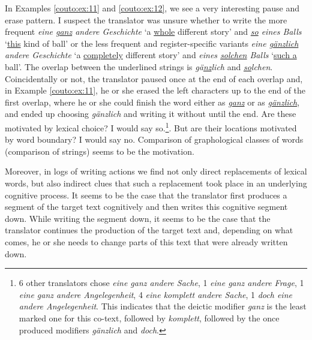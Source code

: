 \documentclass[output=paper]{LSP/langsci}
\begin{document}
In Examples \ref{couto:ex:11} and \ref{couto:ex:12}, we see a very interesting pause and erase pattern. I suspect the translator was unsure whether to write the more frequent \emph{eine \uline{ganz} andere Geschichte} `a \uline{whole} different story' and \emph{\uline{so} eines Balls} `\uline{this} kind of ball' or the less frequent and register-specific variants \emph{eine \uline{gänzlich} andere Geschichte} `a \uline{completely} different story' and  \emph{eines \uline{solchen} Balls} `\uline{such a} ball'. The overlap between the underlined strings is \emph{\uline{g}ä\uline{nz}lich} and \emph{\uline{so}lchen}. Coincidentally or not, the translator paused once at the end of each overlap and, in Example \ref{couto:ex:11}, he or she erased the left characters up to the end of the first overlap, where he or she could finish the word either as \emph{g\uline{anz}} or as \emph{g\uline{änzlich}}, and ended up choosing \emph{gänzlich} and writing it without  until the end. Are these  motivated by lexical choice? I would say so.\footnote{6 other translators chose \emph{eine ganz andere Sache}, 1 \emph{eine ganz andere Frage}, 1 \emph{eine ganz andere Angelegenheit}, 4 \emph{eine komplett andere Sache}, 1 \emph{doch eine andere Angelegenheit}. This indicates that the deictic modifier \emph{ganz} is the least marked one for this co-text, followed by \emph{komplett}, followed by the once produced modifiers \emph{gänzlich} and \emph{doch}.}.
But are their locations motivated by word boundary? I would say no. Comparison of graphological classes of words (comparison of strings) seems to be the motivation.

Moreover, in logs of writing actions we find not only direct replacements of lexical words, but also indirect clues that such a replacement took place in an underlying cognitive process. It seems to be the case that the translator first produces a segment of the target text cognitively and then writes this cognitive segment down. While writing the segment down, it seems to be the case that the translator continues the production of the target text and, depending on what comes, he or she needs to change parts of this text that were already written down.
\end{document}
